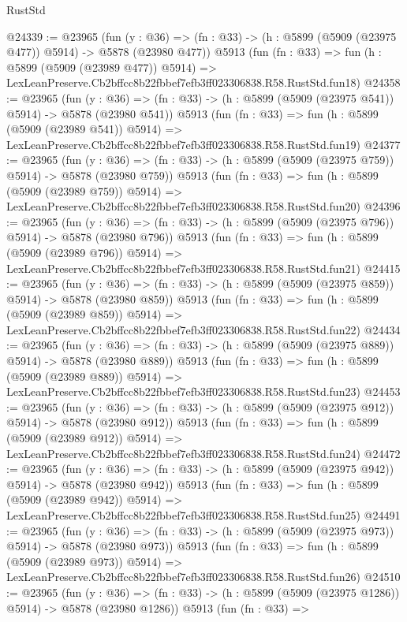 \begin{lexlean}{RustStd}
\begin{coremodule}
{{@24339 := @23965
    (fun (y : @36) => (fn : @33) -> (h : @5899 (@5909 (@23975 @477)) @5914) -> @5878 (@23980 @477))
    @5913
    (fun (fn : @33) =>
    fun (h : @5899 (@5909 (@23989 @477)) @5914) =>
    LexLeanPreserve.Cb2bffcc8b22fbbef7efb3ff023306838.R58.RustStd.fun18)
@24358 := @23965
    (fun (y : @36) => (fn : @33) -> (h : @5899 (@5909 (@23975 @541)) @5914) -> @5878 (@23980 @541))
    @5913
    (fun (fn : @33) =>
    fun (h : @5899 (@5909 (@23989 @541)) @5914) =>
    LexLeanPreserve.Cb2bffcc8b22fbbef7efb3ff023306838.R58.RustStd.fun19)
@24377 := @23965
    (fun (y : @36) => (fn : @33) -> (h : @5899 (@5909 (@23975 @759)) @5914) -> @5878 (@23980 @759))
    @5913
    (fun (fn : @33) =>
    fun (h : @5899 (@5909 (@23989 @759)) @5914) =>
    LexLeanPreserve.Cb2bffcc8b22fbbef7efb3ff023306838.R58.RustStd.fun20)
@24396 := @23965
    (fun (y : @36) => (fn : @33) -> (h : @5899 (@5909 (@23975 @796)) @5914) -> @5878 (@23980 @796))
    @5913
    (fun (fn : @33) =>
    fun (h : @5899 (@5909 (@23989 @796)) @5914) =>
    LexLeanPreserve.Cb2bffcc8b22fbbef7efb3ff023306838.R58.RustStd.fun21)
@24415 := @23965
    (fun (y : @36) => (fn : @33) -> (h : @5899 (@5909 (@23975 @859)) @5914) -> @5878 (@23980 @859))
    @5913
    (fun (fn : @33) =>
    fun (h : @5899 (@5909 (@23989 @859)) @5914) =>
    LexLeanPreserve.Cb2bffcc8b22fbbef7efb3ff023306838.R58.RustStd.fun22)
@24434 := @23965
    (fun (y : @36) => (fn : @33) -> (h : @5899 (@5909 (@23975 @889)) @5914) -> @5878 (@23980 @889))
    @5913
    (fun (fn : @33) =>
    fun (h : @5899 (@5909 (@23989 @889)) @5914) =>
    LexLeanPreserve.Cb2bffcc8b22fbbef7efb3ff023306838.R58.RustStd.fun23)
@24453 := @23965
    (fun (y : @36) => (fn : @33) -> (h : @5899 (@5909 (@23975 @912)) @5914) -> @5878 (@23980 @912))
    @5913
    (fun (fn : @33) =>
    fun (h : @5899 (@5909 (@23989 @912)) @5914) =>
    LexLeanPreserve.Cb2bffcc8b22fbbef7efb3ff023306838.R58.RustStd.fun24)
@24472 := @23965
    (fun (y : @36) => (fn : @33) -> (h : @5899 (@5909 (@23975 @942)) @5914) -> @5878 (@23980 @942))
    @5913
    (fun (fn : @33) =>
    fun (h : @5899 (@5909 (@23989 @942)) @5914) =>
    LexLeanPreserve.Cb2bffcc8b22fbbef7efb3ff023306838.R58.RustStd.fun25)
@24491 := @23965
    (fun (y : @36) => (fn : @33) -> (h : @5899 (@5909 (@23975 @973)) @5914) -> @5878 (@23980 @973))
    @5913
    (fun (fn : @33) =>
    fun (h : @5899 (@5909 (@23989 @973)) @5914) =>
    LexLeanPreserve.Cb2bffcc8b22fbbef7efb3ff023306838.R58.RustStd.fun26)
@24510 := @23965
    (fun (y : @36) =>
    (fn : @33) -> (h : @5899 (@5909 (@23975 @1286)) @5914) -> @5878 (@23980 @1286))
    @5913
    (fun (fn : @33) =>
}}
\end{coremodule}
\end{lexlean}
